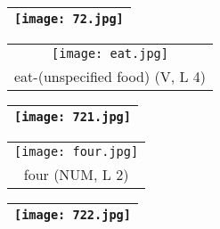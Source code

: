 \documentclass{tufte-book}
\begin{document}
\begin{fullwidth}
\begin{table*}[h!]
\begin{tabular}{c}
 
 
\end{tabular}
\end{table*}
\begin{table}[h!]
\begin{tabular}{|c|}
\hline
\texttt{[image: 72.jpg]}\\
 
 \hline
\end{tabular}
\label{page:72}
\end{table}

 \begin{table*}[h!]
\begin{tabular}{c}
   \texttt{[image: eat.jpg]}\\
  eat-(unspecified food) (V, L 4) \\%
 
 
 
\end{tabular}
\end{table*}
\begin{table}[h!]
\begin{tabular}{|c|}
\hline
\texttt{[image: 721.jpg]}\\
 
 \hline
\end{tabular}
\label{page:721}
\end{table}

 \begin{table*}[h!]
\begin{tabular}{c}
   \texttt{[image: four.jpg]}\\
  four (NUM, L 2) \\%
 
 
 
\end{tabular}
\end{table*}
\newpage
\begin{table}[h!]
\begin{tabular}{|c|}
\hline
\texttt{[image: 722.jpg]}\\
 
 \hline
\end{tabular}
\label{page:722}
\end{table}


\end{fullwidth}
\end{document}

